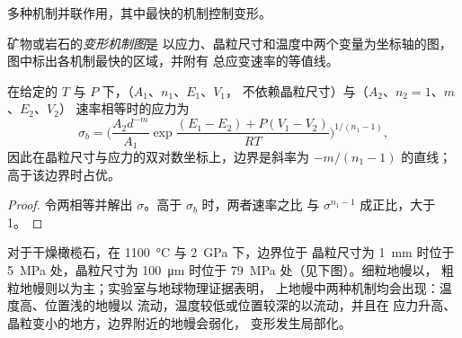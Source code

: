 多种机制并联作用，其中最快的机制控制变形。

\begin{definition}[变形机制图]\label{def:b3:deformation-mechanisms:deformation-map}
矿物或岩石的\emph{变形机制图}是
以应力、晶粒尺寸和温度中两个变量为坐标轴的图，
图中标出各机制最快的区域，并附有
总应变速率的等值线。
\end{definition}

\begin{proposition}[机制边界]\label{prop:b3:deformation-mechanisms:boundary}
在给定的 $T$ 与 $P$ 下，（$A_1$、$n_1$、$E_1$、$V_1$，
不依赖晶粒尺寸）与（$A_2$、$n_2 = 1$、$m$、$E_2$、$V_2$）
速率相等时的应力为
\[
  \sigma_b = \biggl(\frac{A_2d^{-m}}{A_1}
  \exp\frac{(E_1 - E_2) + P(V_1 - V_2)}{RT}\biggr)^{1/(n_1 - 1)} ,
\]
因此在晶粒尺寸与应力的双对数坐标上，边界是斜率为 $-m/(n_1 - 1)$ 的直线；
高于该边界时占优。
\end{proposition}

\begin{proof}
令两相等并解出 $\sigma$。高于 $\sigma_b$ 时，两者速率之比
与 $\sigma^{n_1 - 1}$ 成正比，大于 1。
\end{proof}

对于干燥橄榄石，在 \qty{1100}{\celsius} 与 \qty{2}{GPa} 下，边界位于
晶粒尺寸为 \qty{1}{mm} 时位于 \qty{5}{MPa} 处，晶粒尺寸为
\qty{100}{\micro m} 时位于 \qty{79}{MPa} 处（见下图）。细粒地幔以，
粗粒地幔则以为主；实验室与地球物理证据表明，
上地幔中两种机制均会出现：温度高、位置浅的地幔以
流动，温度较低或位置较深的以流动，并且在
应力升高、晶粒变小的地方，边界附近的地幔会弱化，
变形发生局部化。

